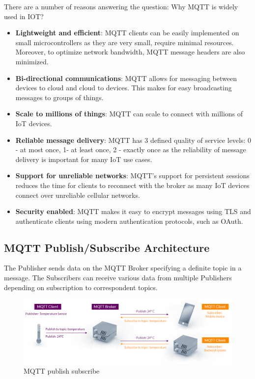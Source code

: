 \documentclass[\main/thesis.tex]{subfiles}
\begin{document}
There are a number of reasons answering the question: Why MQTT is widely used in IOT? 
\begin{itemize}
    \item \textbf{Lightweight and efficient}: MQTT clients can be easily implemented on small microcontrollers as they are very small, require minimal resources. Moreover, to optimize network bandwidth, MQTT message headers are also minimized.
    \item \textbf{Bi-directional communications}: MQTT allows for messaging between devices to cloud and cloud to devices. This makes for easy broadcasting messages to groups of things.
    \item \textbf{Scale to millions of things}: MQTT can scale to connect with millions of IoT devices.
    \item \textbf{Reliable message delivery}: MQTT has 3 defined quality of service levels: 0 - at most once, 1- at least once, 2 - exactly once as the reliability of message delivery is important for many IoT use cases.
    \item \textbf{Support for unreliable networks}: MQTT's support for persistent sessions reduces the time for clients to reconnect with the broker as many IoT devices connect over unreliable cellular networks. 
    \item \textbf{Security enabled}: MQTT makes it easy to encrypt messages using TLS and authenticate clients using modern authentication protocols, such as OAuth.
\end{itemize}

\subsection{MQTT Publish/Subscribe Architecture}
The Publisher sends data on the MQTT Broker specifying a definite topic in a message. The Subscribers can receive various data from multiple Publishers depending on subscription to correspondent topics.
\begin{figure}[H]
    \begin{center}
        \includegraphics[scale=0.35]{mqtt-publish-subscribe.png}
    \end{center}
    \caption{MQTT publish subscribe}
    \label{fig:mqtt_publish_subscribe}
\end{figure}
\end{document}
